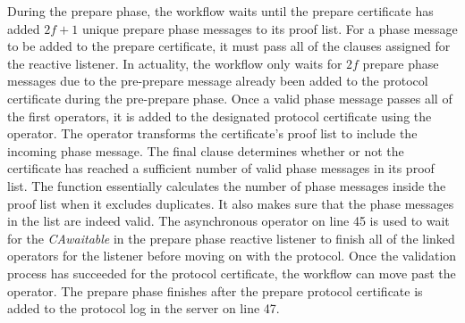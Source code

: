 During the prepare phase, the workflow waits until the prepare certificate has added $2f+1$ unique prepare phase messages to its proof list. For a phase message to be added to the prepare certificate, it must pass all of the  clauses assigned for the reactive listener. In actuality, the workflow only waits for $2f$ prepare phase messages due to the pre-prepare message already been added to the protocol certificate during the pre-prepare phase. Once a valid phase message passes all of the first  operators, it is added to the designated protocol certificate using the  operator. The  operator transforms the certificate’s proof list to include the incoming phase message.  The final  clause determines whether or not the certificate has reached a sufficient number of valid phase messages in its proof list.
The  function essentially calculates the number of phase messages inside the proof list when it excludes duplicates. It also makes sure that the phase messages in the list are indeed valid. The asynchronous  operator on line 45 is used to wait for the \emph{CAwaitable} in the prepare phase reactive listener to finish all of the linked operators for the listener before moving on with the protocol. Once the validation process has succeeded for the protocol certificate, the workflow can move past the  operator. The prepare phase finishes after the prepare protocol certificate is added to the protocol log in the server on line 47.

